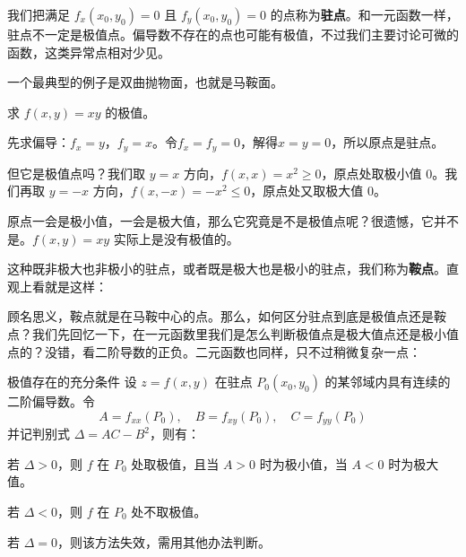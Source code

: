 我们把满足 $f_x(x_0, y_0)=0$ 且 $f_y(x_0, y_0)=0$ 的点称为\textbf{驻点}。和一元函数一样，驻点不一定是极值点。偏导数不存在的点也可能有极值，不过我们主要讨论可微的函数，这类异常点相对少见。

一个最典型的例子是双曲抛物面，也就是马鞍面。

\begin{myexample}
  求 $f(x, y) = xy$ 的极值。

  先求偏导：$f_x = y$，$f_y = x$。令$f_x=f_y=0$，解得$x=y=0$，所以原点是驻点。

  但它是极值点吗？我们取 $y=x$ 方向，$f(x, x) = x^2 \ge 0$，原点处取极小值 $0$。我们再取 $y=-x$ 方向，$f(x, -x) = -x^2 \le 0$，原点处又取极大值 $0$。
  
  原点一会是极小值，一会是极大值，那么它究竟是不是极值点呢？很遗憾，它并不是。$f(x, y) = xy$ 实际上是没有极值的。
\end{myexample}

这种既非极大也非极小的驻点，或者既是极大也是极小的驻点，我们称为\textbf{鞍点}。直观上看就是这样：

\begin{center}
\end{center}


顾名思义，鞍点就是在马鞍中心的点。那么，如何区分驻点到底是极值点还是鞍点？我们先回忆一下，在一元函数里我们是怎么判断极值点是极大值点还是极小值点的？没错，看二阶导数的正负。二元函数也同样，只不过稍微复杂一点：

\begin{theorem}{极值存在的充分条件}{}
设 $z = f(x, y)$ 在驻点 $P_0(x_0, y_0)$ 的某邻域内具有连续的二阶偏导数。令
\[
A = f_{xx}(P_0),\quad B = f_{xy}(P_0),\quad C = f_{yy}(P_0)
\]
并记判别式 $\Delta = AC - B^2$，则有：

若 $\Delta > 0$，则 $f$ 在 $P_0$ 处取极值，且当 $A > 0$ 时为极小值，当 $A < 0$ 时为极大值。

若 $\Delta < 0$，则 $f$ 在 $P_0$ 处不取极值。

若 $\Delta = 0$，则该方法失效，需用其他办法判断。

\end{theorem}

